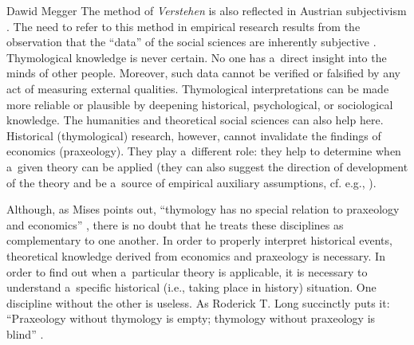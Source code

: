 \begin{artengenv}{Dawid Megger}
The method of \textit{Verstehen} is also reflected in Austrian subjectivism 
\parencite[][]{lachmann_legacy_1971}. %
 The need to refer to this method in empirical research results from the observation that the ``data'' of the social sciences are inherently subjective 
\parencite[][]{hayek_counter-revolution_1952}.%
Thymological knowledge is never certain. No one has a~direct insight into the minds of other people. Moreover, such data cannot be verified or falsified by any act of measuring external qualities. Thymological interpretations can be made more reliable or plausible by deepening historical, psychological, or sociological knowledge. The humanities and theoretical social sciences can also help here. Historical (thymological) research, however, cannot invalidate the findings of economics (praxeology). They play a~different role: they help to determine when a~given theory can be applied (they can also suggest the direction of development of the theory and be a~source of empirical auxiliary assumptions, cf. e.g., 
\parencite[][]{wisniewski_methodology_2014}%
).



Although, as Mises points out, ``thymology has no special relation to praxeology and economics'' 
\parencite[][p.271]{mises_theory_2007}, %
 there is no doubt that he treats these disciplines as complementary to one another. In order to properly interpret historical events, theoretical knowledge derived from economics and praxeology is necessary. In order to find out when a~particular theory is applicable, it is necessary to understand a~specific historical (i.e., taking place in history) situation. One discipline without the other is useless. As Roderick T. Long succinctly puts it: ``Praxeology without thymology is empty; thymology without praxeology is blind'' 
\parencite[][p.50]{long_wittgenstein_2008}.%





\end{artengenv}
